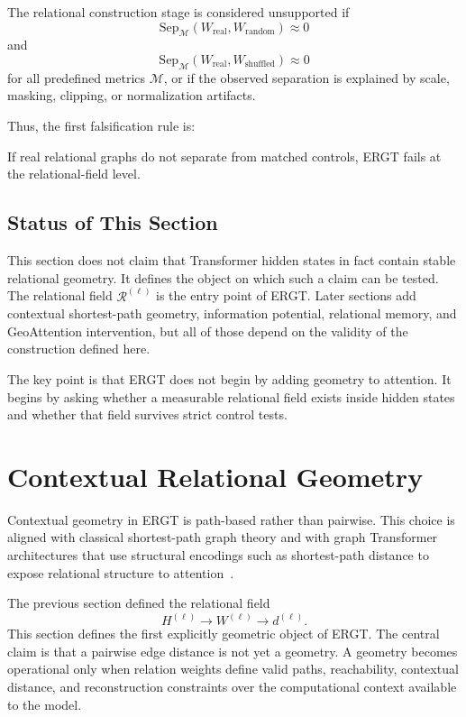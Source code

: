 \documentclass[11pt]{article}
\begin{document}
The relational construction stage is considered unsupported if
\[
\mathrm{Sep}_{\mathcal{M}}(W_{\mathrm{real}},W_{\mathrm{random}})\approx 0
\]
and
\[
\mathrm{Sep}_{\mathcal{M}}(W_{\mathrm{real}},W_{\mathrm{shuffled}})\approx 0
\]
for all predefined metrics $\mathcal{M}$, or if the observed separation is explained by scale, masking, clipping, or normalization artifacts.

Thus, the first falsification rule is:
\begin{ergtclaim}
If real relational graphs do not separate from matched controls, ERGT fails at the relational-field level.
\end{ergtclaim}

\subsection{Status of This Section}

This section does not claim that Transformer hidden states in fact contain stable relational geometry. It defines the object on which such a claim can be tested. The relational field $\mathcal{R}^{(\ell)}$ is the entry point of ERGT. Later sections add contextual shortest-path geometry, information potential, relational memory, and GeoAttention intervention, but all of those depend on the validity of the construction defined here.

The key point is that ERGT does not begin by adding geometry to attention. It begins by asking whether a measurable relational field exists inside hidden states and whether that field survives strict control tests.




\section{Contextual Relational Geometry}
\noindent Contextual geometry in ERGT is path-based rather than pairwise. This choice is aligned with classical shortest-path graph theory and with graph Transformer architectures that use structural encodings such as shortest-path distance to expose relational structure to attention~\cite{dijkstra1959note,chung1997spectral,ying2021graphormer}.


The previous section defined the relational field
\[
H^{(\ell)} \longrightarrow W^{(\ell)} \longrightarrow d^{(\ell)}.
\]
This section defines the first explicitly geometric object of ERGT. The central claim is that a pairwise edge distance is not yet a geometry. A geometry becomes operational only when relation weights define valid paths, reachability, contextual distance, and reconstruction constraints over the computational context available to the model.
\end{document}

